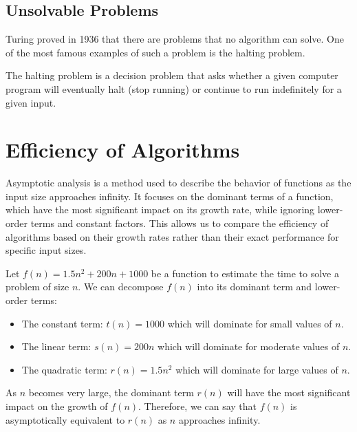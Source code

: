 \subsection{Unsolvable Problems}
Turing proved in 1936 that there are problems that no algorithm can solve. One of the most famous examples of such a problem is the halting problem.
\begin{definition}
    The halting problem is a decision problem that asks whether a given computer program will eventually halt (stop running) or continue to run indefinitely for a given input.
\end{definition}

\section{Efficiency of Algorithms}
\begin{definition}
    Asymptotic analysis is a method used to describe the behavior of functions as the input size approaches infinity. It focuses on the dominant terms of a function, which have the most significant impact on its growth rate, while ignoring lower-order terms and constant factors. This allows us to compare the efficiency of algorithms based on their growth rates rather than their exact performance for specific input sizes.
\end{definition}
\begin{eg}
    Let $f(n) = 1.5n^2 + 200n + 1000$ be a function to estimate the time to solve a problem of size $n$. We can decompose $f(n)$ into its dominant term and lower-order terms:
    \begin{itemize}[itemsep=1pt,label=$\circ$]
        \item The constant term: $t(n) = 1000$ which will dominate for small values of $n$.
        \item The linear term: $s(n) = 200n$ which will dominate for moderate values of $n$.
        \item The quadratic term: $r(n) = 1.5n^2$ which will dominate for large values of $n$.
    \end{itemize}
    As $n$ becomes very large, the dominant term $r(n)$ will have the most significant impact on the growth of $f(n)$. Therefore, we can say that $f(n)$ is asymptotically equivalent to $r(n)$ as $n$ approaches infinity.
\end{eg}

